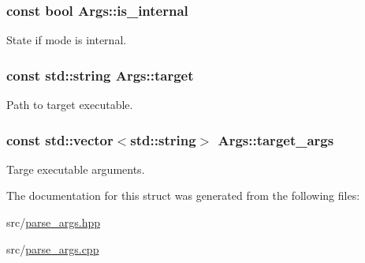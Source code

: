 \subsubsection[{\texorpdfstring{is\+\_\+internal}{is_internal}}]{\setlength{\rightskip}{0pt plus 5cm}const bool Args\+::is\+\_\+internal}\hypertarget{struct_args_a52d1f8c8297b000e30ff84b9ff1b9321}{}\label{struct_args_a52d1f8c8297b000e30ff84b9ff1b9321}


State if mode is internal. 

\subsubsection[{\texorpdfstring{target}{target}}]{\setlength{\rightskip}{0pt plus 5cm}const std\+::string Args\+::target}\hypertarget{struct_args_a49f5255b7466ee4e1329aa32ca069da6}{}\label{struct_args_a49f5255b7466ee4e1329aa32ca069da6}


Path to target executable. 

\subsubsection[{\texorpdfstring{target\+\_\+args}{target_args}}]{\setlength{\rightskip}{0pt plus 5cm}const std\+::vector$<$std\+::string$>$ Args\+::target\+\_\+args}\hypertarget{struct_args_aa9f8e387df0b3691352daf352876176d}{}\label{struct_args_aa9f8e387df0b3691352daf352876176d}


Targe executable arguments. 



The documentation for this struct was generated from the following files\+:\begin{DoxyCompactItemize}
\item 
src/\hyperlink{parse__args_8hpp}{parse\+\_\+args.\+hpp}\item 
src/\hyperlink{parse__args_8cpp}{parse\+\_\+args.\+cpp}\end{DoxyCompactItemize}
